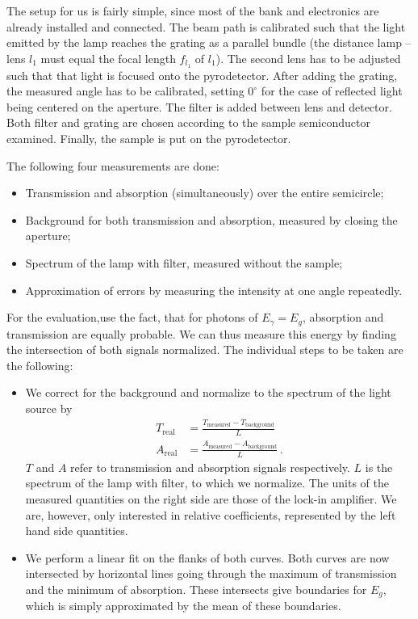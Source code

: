 The setup for us is fairly simple, since most of the bank and 
electronics are already installed and connected. 
The beam path is calibrated such that 
the light emitted by the lamp reaches the grating as a parallel bundle
(the distance lamp -- lens $l_1$ must equal the focal length $f_{l_1}$ of $l_1$).
The second lens has to be adjusted such that that light is focused onto 
the pyrodetector. After adding the grating, the measured angle has to be 
calibrated, setting $0^\circ$ for the case of reflected light being centered 
on the aperture. The filter is added between lens and detector. Both 
filter and grating are chosen according to the sample semiconductor 
examined. Finally, the sample is put on the pyrodetector. 

The following four measurements are done:
\begin{itemize}
    \item
        Transmission and absorption (simultaneously) over the entire 
        semicircle;
    \item
        Background for both transmission and absorption, measured by 
        closing the aperture;
    \item
        Spectrum of the lamp with filter, measured without the sample;
    \item
        Approximation of errors by measuring the intensity at one angle 
        repeatedly.
\end{itemize}
For the evaluation,use the fact, that for photons of
$E_\gamma = E_g$, absorption and transmission are equally probable. 
We can thus measure this energy by finding the intersection 
of both signals normalized. The individual steps to be taken are 
the following:
\begin{itemize}
    \item
        We correct for the background and normalize to the spectrum of 
        the light source by 
        \begin{align}
            T_\mathrm{real} &= \frac{T_\mathrm{measured} - 
                T_\mathrm{background}}{L} 
            \label{eq:t_real} \\
            A_\mathrm{real} &= \frac{A_\mathrm{measured} - 
                A_\mathrm{background}}{L} \, .
            \label{eq:a_real}
        \end{align}
        $T$ and $A$ refer to transmission and absorption signals respectively. 
        $L$ is the spectrum of the lamp with filter, to which we normalize.
        The units of the measured quantities on the right side are those 
        of the lock-in amplifier. We are, however, only interested in relative 
        coefficients, represented by the left hand side quantities. 
    \item
        We perform a linear fit on the flanks of both curves. Both 
        curves are now intersected by horizontal lines going through the 
        maximum of transmission and the minimum of absorption. 
        These intersects give boundaries for $E_g$, which 
        is simply approximated by the mean of these boundaries. 
\end{itemize}


